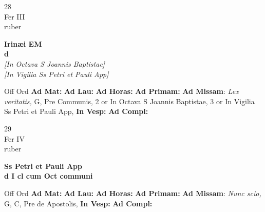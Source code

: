 \documentclass[10pt, openany]{book}
\begin{document}
        \begin{center}
            \begin{minipage}{3.5in}
                \vspace{2em}
                \begin{minipage}{0.5in}
                    {\Huge 28} \\
                    {\normalsize Fer III} \\
                    {\normalsize ruber}
                \end{minipage}
                \begin{minipage}{3.0in}
                    \textbf{ \large Irinæi EM \\
                    \textnormal{\normalsize d}} \\ \textit{[In Octava S Joannis Baptistae]} \\ \textit{[In Vigilia Ss Petri et Pauli App]} \\ 
                \end{minipage}
                \begin{justify}Off Ord
                    \textbf{Ad Mat: }
                    \textbf{Ad Lau: }
                    \textbf{Ad Horas: }
                    \textbf{Ad Primam: }\textbf{Ad Missam}: \textit{Lex veritatis,} G, Pre Communis, 2 or In Octava S Joannis Baptistae, 3 or In Vigilia Ss Petri et Pauli App,  
                    \textbf{In Vesp: }
                    \textbf{Ad Compl: }
                \end{justify}
            \end{minipage}
        \end{center}
    
        \begin{center}
            \begin{minipage}{3.5in}
                \vspace{2em}
                \begin{minipage}{0.5in}
                    {\Huge 29} \\
                    {\normalsize Fer IV} \\
                    {\normalsize ruber}
                \end{minipage}
                \begin{minipage}{3.0in}
                    \textbf{ \large Ss Petri et Pauli App \\
                    \textnormal{\normalsize d I cl cum Oct communi}} \\ 
                \end{minipage}
                \begin{justify}Off Ord
                    \textbf{Ad Mat: }
                    \textbf{Ad Lau: }
                    \textbf{Ad Horas: }
                    \textbf{Ad Primam: }\textbf{Ad Missam}: \textit{Nunc scio,} G, C, Pre de Apostolis,  
                    \textbf{In Vesp: }
                    \textbf{Ad Compl: }
                \end{justify}
            \end{minipage}
        \end{center}
    
\end{document}
